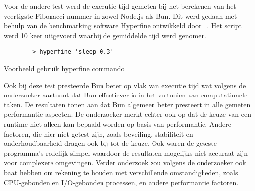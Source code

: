 Voor de andere test werd de executie tijd gemeten bij het berekenen van het veertigste Fibonacci nummer in zowel Node.js als Bun. 
Dit werd gedaan met behulp van de benchmarking software Hyperfine ontwikkeld door ~\textcite{Pompeii2024}. 
Het script werd 10 keer uitgevoerd waarbij de gemiddelde tijd werd genomen.
\begin{listing}[H]
    \centering
    \begin{verbatim}
        > hyperfine 'sleep 0.3'
        \end{verbatim}
        \caption{Voorbeeld gebruik hyperfine commando \autocite{Pompeii2024}}
\end{listing}
Ook bij deze test presteerde Bun beter op vlak van executie tijd wat volgens de onderzoeker aantoont dat Bun effectiever is in het voltooien van computationele taken.
De resultaten tonen aan dat 
Bun algemeen beter presteert in alle gemeten performantie aspecten.
De onderzoeker merkt echter ook op dat de keuze van een runtime niet alleen kan bepaald worden op basis van 
performantie. Andere factoren, die hier niet getest zijn, zoals beveiling, stabiliteit en onderhoudbaarheid dragen ook bij tot de keuze. 
Ook waren de geteste programma's redelijk simpel waardoor de resultaten mogelijks niet accuraat zijn voor complexere omgevingen. 
Verder onderzoek zou volgens de onderzoeker ook baat hebben om rekening te houden met verschillende omstandigheden, zoals CPU-gebonden
en I/O-gebonden processen, en andere performantie factoren.